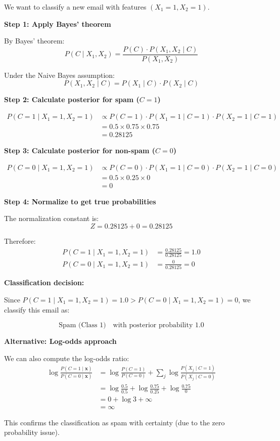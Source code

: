 \documentclass[12pt]{article}
\begin{document}
\begin{solution}
We want to classify a new email with features $(X_1 = 1, X_2 = 1)$.

\textbf{Step 1: Apply Bayes' theorem}

By Bayes' theorem:
\[
P(C \mid X_1, X_2) = \frac{P(C) \cdot P(X_1, X_2 \mid C)}{P(X_1, X_2)}
\]

Under the Naive Bayes assumption:
\[
P(X_1, X_2 \mid C) = P(X_1 \mid C) \cdot P(X_2 \mid C)
\]

\textbf{Step 2: Calculate posterior for spam ($C = 1$)}

\begin{align}
P(C = 1 \mid X_1 = 1, X_2 = 1) &\propto P(C = 1) \cdot P(X_1 = 1 \mid C = 1) \cdot P(X_2 = 1 \mid C = 1) \\
&= 0.5 \times 0.75 \times 0.75 \\
&= 0.28125
\end{align}

\textbf{Step 3: Calculate posterior for non-spam ($C = 0$)}

\begin{align}
P(C = 0 \mid X_1 = 1, X_2 = 1) &\propto P(C = 0) \cdot P(X_1 = 1 \mid C = 0) \cdot P(X_2 = 1 \mid C = 0) \\
&= 0.5 \times 0.25 \times 0 \\
&= 0
\end{align}

\textbf{Step 4: Normalize to get true probabilities}

The normalization constant is:
\[
Z = 0.28125 + 0 = 0.28125
\]

Therefore:
\begin{align}
P(C = 1 \mid X_1 = 1, X_2 = 1) &= \frac{0.28125}{0.28125} = 1.0 \\
P(C = 0 \mid X_1 = 1, X_2 = 1) &= \frac{0}{0.28125} = 0
\end{align}

\textbf{Classification decision:}

Since $P(C = 1 \mid X_1 = 1, X_2 = 1) = 1.0 > P(C = 0 \mid X_1 = 1, X_2 = 1) = 0$, we classify this email as:

\[
\boxed{\text{Spam (Class 1)} \quad \text{with posterior probability } 1.0}
\]

\textbf{Alternative: Log-odds approach}

We can also compute the log-odds ratio:
\begin{align}
\log \frac{P(C = 1 \mid \mathbf{x})}{P(C = 0 \mid \mathbf{x})} &= \log \frac{P(C = 1)}{P(C = 0)} + \sum_{j} \log \frac{P(X_j \mid C = 1)}{P(X_j \mid C = 0)} \\
&= \log \frac{0.5}{0.5} + \log \frac{0.75}{0.25} + \log \frac{0.75}{0} \\
&= 0 + \log 3 + \infty \\
&= \infty
\end{align}

This confirms the classification as spam with certainty (due to the zero probability issue).
\end{solution}
\end{document}
